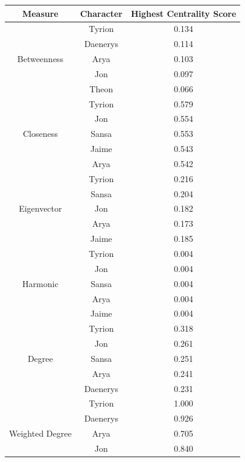 \documentclass[10pt,twocolumn,letterpaper]{article}
\begin{document}
\begin{table}[!h]
    \centering
    \small
    \begin{tabular}{c|c|c}
        Measure & Character & \small{Highest Centrality Score} \\
        \hline
                    & Tyrion & 0.134 \\
                    & Daenerys & 0.114 \\
        Betweenness & Arya & 0.103 \\
                    & Jon & 0.097 \\
                    & Theon & 0.066 \\
        \hline 
                    & Tyrion & 0.579 \\
                    & Jon & 0.554 \\
        Closeness   & Sansa & 0.553 \\
                    & Jaime & 0.543 \\
                    & Arya & 0.542 \\
        \hline 
                    & Tyrion & 0.216 \\
                    & Sansa & 0.204 \\
        Eigenvector & Jon & 0.182 \\
                    & Arya & 0.173 \\
                    & Jaime & 0.185 \\
        \hline 
                    & Tyrion & 0.004 \\
                    & Jon & 0.004 \\
        Harmonic    & Sansa & 0.004 \\
                    & Arya & 0.004 \\
                    & Jaime & 0.004 \\
        \hline
                    & Tyrion & 0.318 \\
                    & Jon & 0.261 \\
        Degree      & Sansa & 0.251 \\
                    & Arya & 0.241 \\
                    & Daenerys & 0.231 \\
        \hline
                    & Tyrion & 1.000 \\
                    & Daenerys & 0.926 \\
        Weighted Degree & Arya & 0.705 \\
                    & Jon & 0.840 \\

\end{tabular}
\end{table}
\end{document}
